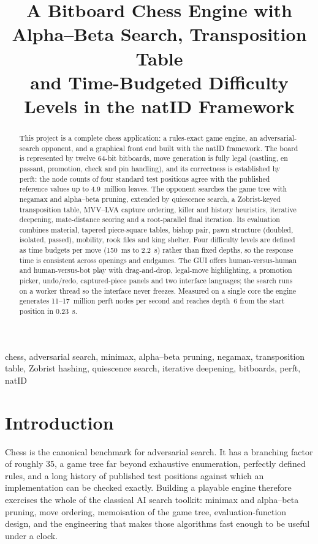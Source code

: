 \documentclass[conference]{IEEEtran}
\title{A Bitboard Chess Engine with Alpha--Beta Search, Transposition Table\\
       and Time-Budgeted Difficulty Levels in the natID Framework}
\author{\IEEEauthorblockN{Faris Muratovi\'c}
\IEEEauthorblockA{Project Report (Artificial Intelligence)\\
Student ID: 19958\\
Faculty of Electrical Engineering, University of Sarajevo\\
Instructor: Prof.\ Dr.\ Izudin D\v{z}afi\'c}}
\begin{document}
\maketitle

\begin{abstract}
This project is a complete chess application: a rules-exact game engine, an adversarial-search opponent, and a graphical front end built with the natID framework. The board is represented by twelve 64-bit bitboards, move generation is fully legal (castling, en passant, promotion, check and pin handling), and its correctness is established by perft: the node counts of four standard test positions agree with the published reference values up to 4.9~million leaves. The opponent searches the game tree with negamax and alpha--beta pruning, extended by quiescence search, a Zobrist-keyed transposition table, MVV--LVA capture ordering, killer and history heuristics, iterative deepening, mate-distance scoring and a root-parallel final iteration. Its evaluation combines material, tapered piece-square tables, bishop pair, pawn structure (doubled, isolated, passed), mobility, rook files and king shelter. Four difficulty levels are defined as time budgets per move (150~ms to 2.2~s) rather than fixed depths, so the response time is consistent across openings and endgames. The GUI offers human-versus-human and human-versus-bot play with drag-and-drop, legal-move highlighting, a promotion picker, undo/redo, captured-piece panels and two interface languages; the search runs on a worker thread so the interface never freezes. Measured on a single core the engine generates 11--17~million perft nodes per second and reaches depth~6 from the start position in 0.23~s.
\end{abstract}

\begin{IEEEkeywords}
chess, adversarial search, minimax, alpha--beta pruning, negamax, transposition table, Zobrist hashing, quiescence search, iterative deepening, bitboards, perft, natID
\end{IEEEkeywords}

\section{Introduction}
Chess is the canonical benchmark for adversarial search. It has a branching factor of roughly 35, a game tree far beyond exhaustive enumeration, perfectly defined rules, and a long history of published test positions against which an implementation can be checked exactly. Building a playable engine therefore exercises the whole of the classical AI search toolkit: minimax and alpha--beta pruning, move ordering, memoisation of the game tree, evaluation-function design, and the engineering that makes those algorithms fast enough to be useful under a clock.
\end{document}
